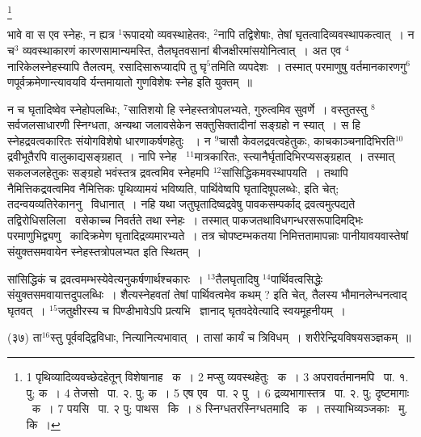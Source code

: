 \documentclass[11pt, openany]{book}
\newcommand\blfootnote[1]{%
 \begingroup
 \renewcommand\thefootnote{}\footnote{#1}%
 \addtocounter{footnote}{-1}%
 \endgroup
}
\begin{document}
\blfootnote{1 पृथिव्यादिव्यवच्छेदहेतून् विशेषानाह  \textendash\ क~। 2 मप्सु व्यवस्थहेतुः  \textendash\ क~। 3 अपरावर्तमानमपि  \textendash\ पा. १. पु; क~। 4 तेजसो  \textendash\ पा. २. पु; क~। 5 एष एव  \textendash\ पा. २ पु~। 6 द्रव्यभागास्तत्र  \textendash\ पा. २. पु; दृष्टमागाः  \textendash\ क~। 7 पयसि \textendash\ पा. २ पु; पाथस  \textendash\ कि~। 8 स्निग्धतरस्निग्धतमादि  \textendash\ क~। तस्याभिव्यञ्जकाः  \textendash\ मु. कि~।}

\newpage
\begin{sloppypar}
\noindent
भावे वा स एव स्नेहः, न ह्यत्र ${}^1$रूपादयो व्यवस्थाहेतवः, ${}^2$नापि तद्विशेषाः, तेषां घृतत्वादिव्यवस्थापकत्वात्~। न च$^3$ व्यवस्थाकारणं कारणसामान्यमस्ति, तैलघृतवसानां बीजक्षीरमांसयोनित्वात्~। अत एव ${}^4$नारिकेलस्नेहस्यापि तैलत्वम्, रसादिसारूप्यादपि तु घृ$^5$तमिति व्यपदेशः~। तस्मात् परमाणुषु वर्तमानकारणगु$^6$णपूर्वक्रमेणान्त्यावयवि र्यन्तमायातो गुणविशेषः स्नेह इति युक्तम्~॥
\end{sloppypar}

न च घृतादिष्वेव स्नेहोपलब्धिः, ${}^7$सातिशयो हि स्नेहस्तत्रोपलभ्यते, गुरुत्वमिव सुवर्णे~। वस्तुतस्तु ${}^8$सर्वजलसाधारणी स्निग्धता, अन्यथा जलावसेकेन सक्तुसिक्तादीनां सङ्ग्रहो न स्यात्~। स हि स्नेहद्रवत्वकारितः संयोगविशेषो धारणाकर्षणहेतुः ~। न ${}^9$चासौ केवलद्रवत्वहेतुकः, काचकाञ्चनादिभिरति$^10$द्रवीभूतैरपि वालुकाद्यसङ्ग्रहात्~। नापि स्नेह \textendash\ ${}^11$मात्रकारितः, स्त्यानैर्घृतादिभिरप्यसङ्ग्रहात्~। तस्मात् सकलजलहेतुकः सङ्ग्रहो भवंस्तत्र द्रवत्वमिव स्नेहमपि ${}^12$सांसिद्धिकमवस्थापयति~। तथापि नैमित्तिकद्रवत्वमिव नैमित्तिकः पृथिव्यामयं भविष्यति, पार्थिवेष्वपि घृतादिषूपलब्धेः, इति चेत्; तदन्वयव्यतिरेकाननु \textendash\ विधानात्~। नहि यथा जतुघृतादिष्वद्रवेषु पावकसम्पर्काद् द्रवत्वमुत्पद्यते तद्विरोधिसलिला \textendash\ वसेकाच्च निवर्तते तथा स्नेहः~। तस्मात् पाकजतथाविधगन्धरसरूपादिमद्भिः परमाणुभिद्व्यणु \textendash\ कादिक्रमेण घृतादिद्रव्यमारभ्यते~। तत्र चोपष्टम्भकतया निमित्ततामापन्नाः पानीयावयवास्तेषां संयुक्तसमवायेन स्नेहस्तत्रोपलभ्यत इति स्थितम्~।

\begin{sloppypar}
{\knu सांसिद्धिकं च द्रवत्वम}म्भस्येवेत्यनुकर्षणार्थश्चकारः~। ${}^13$तैलघृतादिषु ${}^14$पार्थिवत्वसिद्धेः संयुक्तसमवायात्तदुपलब्धिः~। शैत्यस्नेहवतां तेषां पार्थिवत्वमेव कथम् ? इति चेत्, तैलस्य भौमानलेन्धनत्वाद् घृतवत्~। ${}^15$जतुक्षीरस्य च पिण्डीभावेऽपि प्रत्यभि \textendash\ ज्ञानाद् घृतवदेवेत्यादि स्वयमूहनीयम्~।
\end{sloppypar}

\hangindent=2cm {\knu (३७) ता$^16$स्तु पूर्ववद्द्विविधाः, नित्यानित्यभावात्~। तासां कार्यं च त्रिविधम्~। शरीरेन्द्रियविषयसञ्ज्ञकम्~॥}
\end{document}
